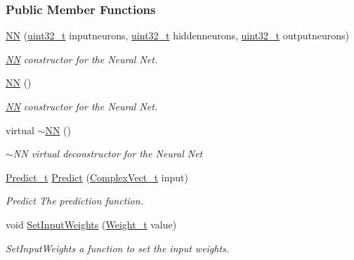 \subsubsection*{Public Member Functions}
\begin{DoxyCompactItemize}
\item 
\hyperlink{class_soil_math_1_1_n_n_a46efd1eb7e31be2818c9858b640fcb5b}{N\+N} (\hyperlink{_soil_math_types_8h_a435d1572bf3f880d55459d9805097f62}{uint32\+\_\+t} inputneurons, \hyperlink{_soil_math_types_8h_a435d1572bf3f880d55459d9805097f62}{uint32\+\_\+t} hiddenneurons, \hyperlink{_soil_math_types_8h_a435d1572bf3f880d55459d9805097f62}{uint32\+\_\+t} outputneurons)
\begin{DoxyCompactList}\small\item\em \hyperlink{class_soil_math_1_1_n_n}{N\+N} constructor for the Neural Net. \end{DoxyCompactList}\item 
\hyperlink{class_soil_math_1_1_n_n_a778606ea8a193479da233a030d1df234}{N\+N} ()
\begin{DoxyCompactList}\small\item\em \hyperlink{class_soil_math_1_1_n_n}{N\+N} constructor for the Neural Net. \end{DoxyCompactList}\item 
virtual \hyperlink{class_soil_math_1_1_n_n_a37cb0ebe3576af3cf47c2e6330e1b34a}{$\sim$\+N\+N} ()
\begin{DoxyCompactList}\small\item\em $\sim$\+N\+N virtual deconstructor for the Neural Net \end{DoxyCompactList}\item 
\hyperlink{_soil_math_types_8h_aaeba766195a440b2539f0438d3d41f95}{Predict\+\_\+t} \hyperlink{class_soil_math_1_1_n_n_aa7f23fcdb8383a74586c9c30b8bc0af7}{Predict} (\hyperlink{_soil_math_types_8h_a7567e521c2b2c408dcb62dbff72390f7}{Complex\+Vect\+\_\+t} input)
\begin{DoxyCompactList}\small\item\em Predict The prediction function. \end{DoxyCompactList}\item 
void \hyperlink{class_soil_math_1_1_n_n_a411371d8297e9d1ff10c919d1293d80e}{Set\+Input\+Weights} (\hyperlink{_soil_math_types_8h_ac56ad2b88186620fd0de0d213aa715dd}{Weight\+\_\+t} value)
\begin{DoxyCompactList}\small\item\em Set\+Input\+Weights a function to set the input weights. \end{DoxyCompactList}\item 

\end{DoxyCompactItemize}
